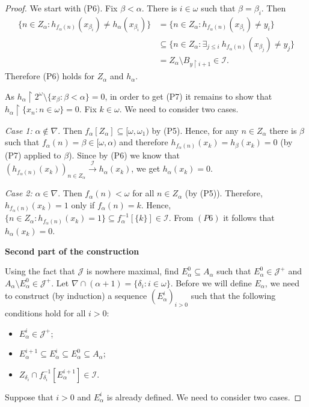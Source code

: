 \documentclass{amsart}
\theoremstyle{plain}
\theoremstyle{definition}
\theoremstyle{remark}
\newcommand{\cI}{\mathcal{I}}
\newcommand{\I}{\cI}
\newcommand{\cJ}{\mathcal{J}}
\newcommand{\J}{\cJ}
\begin{document}
\begin{proof}
We start with (P6). Fix $\beta<\alpha$. There is $i \in \omega$ such that $\beta=\beta_i$. Then 
\begin{equation*}
    \begin{split}
        \{ n \in Z_\alpha:h_{f_\alpha(n)}(x_{\beta_i})\neq h_\alpha(x_{\beta_i}) \}
        &
        =\{ n \in Z_\alpha: h_{f_\alpha(n)}(x_{\beta_i})\neq y_i\} 
        \\&
        \subseteq \{n \in Z_\alpha: \exists_{j \leq i}\ h_{f_\alpha(n)}(x_{\beta_j})\neq y_j   \}
        \\&
        =Z_\alpha \setminus B_{y\upharpoonright i+1} \in \I.
 \end{split}
 \end{equation*} 
Therefore (P6) holds for $Z_\alpha$ and $h_\alpha$.

\medskip

As $h_\alpha\upharpoonright2^\omega\setminus\{x_\beta:\beta<\alpha\}=0$, in order to get (P7) it remains to show that $h_\alpha\upharpoonright\{x_n:n\in \omega\}=0$. Fix $k \in \omega$. We need to consider two cases.

\smallskip

\textit{Case 1:} $\alpha \notin \nabla$. Then $f_\alpha[Z_\alpha]\subseteq[\omega,\omega_1)$ by (P5). Hence, for any $n \in Z_\alpha$ there is $\beta$ such that $f_\alpha(n)=\beta\in [\omega,\alpha)$ and therefore $h_{f_\alpha(n)}(x_k)=h_\beta(x_k)=0$ (by (P7) applied to $\beta$). Since by (P6) we know that $(h_{f_\alpha(n)}(x_k))_{n \in Z_\alpha} \overset{\I}{\longrightarrow} h_\alpha(x_k)$, we get $h_{\alpha}(x_k)=0$.

\smallskip

\textit{Case 2:} $\alpha \in \nabla$. Then $f_\alpha(n)<\omega$ for all $n \in Z_\alpha$ (by (P5)). Therefore, $h_{f_\alpha(n)}(x_k)=1$ only if $f_{\alpha}(n)=k$. Hence, $\{n \in Z_\alpha:h_{f_\alpha(n)}(x_k)=1\}\subseteq f_\alpha^{-1}[\{k\}]\in \I$. From $(P6)$ it follows that $h_\alpha(x_k)=0$.

\medskip

\textbf{Second part of the construction}

\medskip

Using the fact that $\J$ is nowhere maximal, find $E_\alpha^0\subseteq A_\alpha$ such that $E_\alpha^0\in \J^+$ and $A_\alpha\setminus E_\alpha^0\in \J^+$. Let $\nabla\cap(\alpha+1)=\{\delta_i:i \in \omega\}$. Before we will define $E_\alpha$, we need to construct (by induction) a sequence $(E_\alpha^i)_{i>0}$ such that the following conditions hold for all $i>0$:
\begin{itemize}
    \item[(a)] $E_\alpha^i \in \J^+$;
    \item[(b)] $E_\alpha^{i+1}\subseteq E_\alpha^i\subseteq E_\alpha^0 \subseteq A_\alpha$;
    \item[(c)] $Z_{\delta_i}\cap f^{-1}_{\delta_i}[E_\alpha^{i+1}]\in \I$.
\end{itemize}
Suppose that $i>0$ and $E_\alpha^i$ is already defined. We need to consider two cases.


\end{proof}
\end{document}
